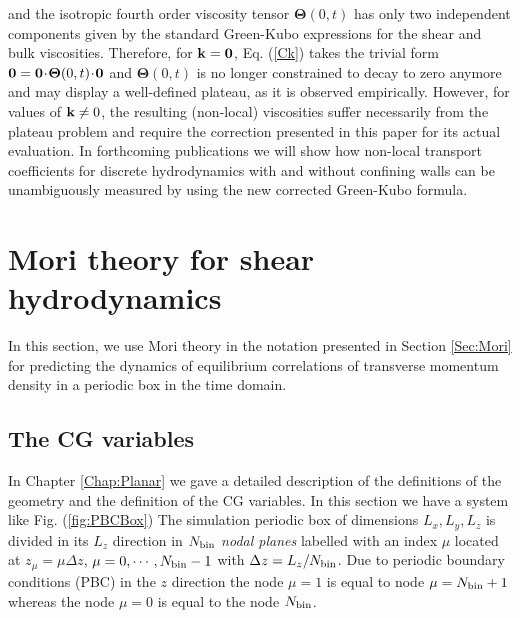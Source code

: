\documentclass[a4paper,openright,12pt]{book}
\newcommand{\esc}{\!\cdot\!}
\begin{document}
and     the     isotropic     fourth    order     viscosity     tensor
$\boldsymbol{\Theta}(0,t)$ has  only two independent  components given
by  the  standard  Green-Kubo  expressions  for  the  shear  and  bulk
viscosities.  Therefore, for ${\bf  k}={\bf 0}$, Eq.  (\ref{Ck}) takes
the trivial form ${\bf 0}={\bf 0}\esc \boldsymbol{\Theta}(0,t)\esc{\bf
  0}$ and $\boldsymbol{\Theta}(0,t)$ is no longer constrained to decay
to  zero anymore  and may  display a  well-defined plateau,  as it  is
observed  empirically. However,  for values  of ${\bf  k}\neq 0$,  the
resulting (non-local) viscosities suffer  necessarily from the plateau
problem and  require the  correction presented in  this paper  for its
actual  evaluation.   In forthcoming  publications  we  will show  how
non-local transport  coefficients for discrete hydrodynamics  with and
without confining walls can be unambiguously measured by using the new
corrected Green-Kubo formula.



\section{Mori theory for shear hydrodynamics}
\label{Sec:MoriShearHydro}
In this section, we use Mori theory in the notation presented in Section \ref{Sec:Mori} for predicting the dynamics of equilibrium correlations of transverse momentum density in a periodic box in the time domain. 
\subsection{The CG variables}
In Chapter \ref{Chap:Planar} we gave a detailed description of the definitions of the geometry and the definition of the CG variables. In this section we have a system like Fig. (\ref{fig:PBCBox})
The simulation periodic box of  dimensions $L_x,L_y,L_z$ is divided in
its $L_z$  direction in  $N_{\rm bin}$ \textit{nodal  planes} labelled
with   an    index   $\mu$   located   at    $z_\mu=\mu   \Delta   z$,
$\mu=0,\cdots,N_{\rm bin}-1$ with $\Delta  z=L_z/N_{\rm bin}$.  Due to
periodic  boundary conditions  (PBC)  in the  $z$  direction the  node
$\mu=1$ is equal to node  $\mu=N_{\rm bin}+1$ whereas the node $\mu=0$
is equal to the node  $N_{\rm bin}$.  
\end{document}
